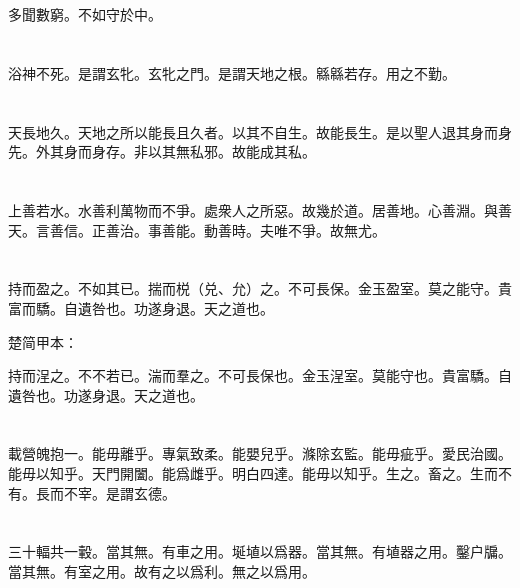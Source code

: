 \documentclass[a5paper]{ctexbook}
\begin{document}
    多聞數窮。不如守於中。

    \chapter{}

    浴神不死。是謂玄牝。玄牝之門。是謂天地之根。緜緜若存。用之不勤。

    \chapter{}

    天長地久。天地之所以能長且久者。以其不自生。故能長生。是以聖人退其身而身先。外其身而身存。非以其無私邪。故能成其私。

    \chapter{}

    上善若水。水善利萬物而不爭。處衆人之所惡。故幾於道。居善地。心善淵。與善天。言善信。正善治。事善能。動善時。夫唯不爭。故無尤。

    \chapter{}

    持而盈之。不如其已。揣而棁（兑、允）之。不可長保。金玉盈室。莫之能守。貴富而驕。自遺咎也。功遂身退。天之道也。

    楚简甲本：

    持而浧之。不不若已。湍而羣之。不可長保也。金玉浧室。莫能守也。貴富驕。自遺咎也。功遂身退。天之道也。

    \chapter{}

    載營魄抱一。能毋離乎。專氣致柔。能嬰兒乎。滌除玄監。能毋疵乎。愛民治國。能毋以知乎。天門開闔。能爲雌乎。明白四達。能毋以知乎。生之。畜之。生而不有。長而不宰。是謂玄德。

    \chapter{}

    三十輻共一轂。當其無。有車之用。埏埴以爲器。當其無。有埴器之用。鑿户牖。當其無。有室之用。故有之以爲利。無之以爲用。

    \chapter{}
\end{document}
